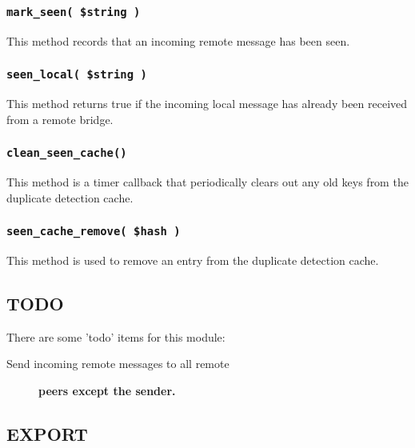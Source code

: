 \subsubsection*{\texttt{mark\_seen( \$string )}\label{xPL::Bridge_mark_seen_string_}}


This method records that an incoming remote message has been seen.

\subsubsection*{\texttt{seen\_local( \$string )}\label{xPL::Bridge_seen_local_string_}}


This method returns true if the incoming local message has already been
received from a remote bridge.

\subsubsection*{\texttt{clean\_seen\_cache()}\label{xPL::Bridge_clean_seen_cache_}}


This method is a timer callback that periodically clears out any
old keys from the duplicate detection cache.

\subsubsection*{\texttt{seen\_cache\_remove( \$hash )}\label{xPL::Bridge_seen_cache_remove_hash_}}


This method is used to remove an entry from the duplicate detection
cache.

\subsection*{TODO\label{xPL::Bridge_TODO}}


There are some 'todo' items for this module:

\begin{description}

\item[{Send incoming remote messages to all remote}] \textbf{peers except the sender.}\end{description}
\subsection*{EXPORT\label{xPL::Bridge_EXPORT}}


